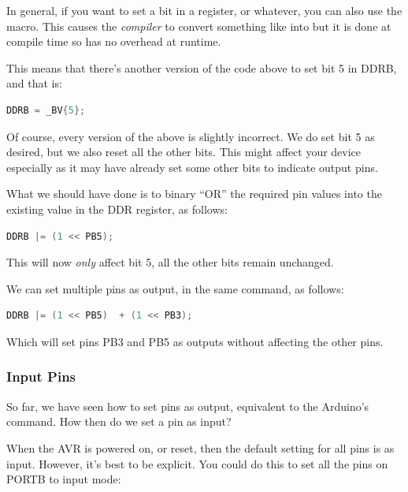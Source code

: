 \begin{note}
	In general, if you want to set a bit in a register, or whatever, you can also use the  macro. This causes the \emph{compiler} to convert something like  into  but it is done at compile time so has no overhead at runtime.
	
	This means that there's another version of the code above to set bit 5 in DDRB, and that is:
	
	\begin{lstlisting}[language=C,numbers={none}]
		DDRB = _BV{5};	\end{lstlisting}	
\end{note}	

Of course, every version of the above is slightly incorrect. We do set bit 5 as desired, but we also reset all the other bits. This might affect your device especially as it may have already set some other bits to indicate output pins.

What we should have done is to binary ``OR'' the required pin values into the existing value in the DDR register, as follows:

\begin{lstlisting}[language=C,numbers={none}]
	DDRB |= (1 << PB5);
\end{lstlisting}

This will now \emph{only} affect bit 5, all the other bits remain unchanged.

We can set multiple pins as output, in the same command, as follows:

\begin{lstlisting}[language=C,numbers={none}]
	DDRB |= (1 << PB5)  + (1 << PB3);
\end{lstlisting}

Which will set pins PB3 and PB5 as outputs without affecting  the other pins.

\subsubsection{Input Pins}\label{avr-pins-input}

So far, we have seen how to set pins as output, equivalent to the Arduino's  command. How then do we set a pin as input?

When the AVR is powered on, or reset, then the default setting for all pins is as input. However, it's best to be explicit. You could do this to set all the pins on PORTB to input mode:

